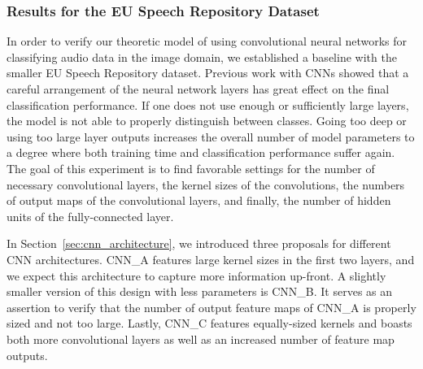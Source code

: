 \subsubsection{Results for the EU Speech Repository Dataset}
\label{sec:results_eu}
In order to verify our theoretic model of using convolutional neural networks for classifying audio data in the image domain, we established a baseline with the smaller EU Speech Repository dataset. Previous work with CNNs showed that a careful arrangement of the neural network layers has great effect on the final classification performance. If one does not use enough or sufficiently large layers, the model is not able to properly distinguish between classes. Going too deep or using too large layer outputs increases the overall number of model parameters to a degree where both training time and classification performance suffer again. The goal of this experiment is to find favorable settings for the number of necessary convolutional layers, the kernel sizes of the convolutions, the numbers of output maps of the convolutional layers, and finally, the number of hidden units of the fully-connected layer.

	In Section~\ref{sec:cnn_architecture}, we introduced three proposals for different CNN architectures. CNN\_A features large kernel sizes in the first two layers, and we expect this architecture to capture more information up-front. A slightly smaller version of this design with less parameters is CNN\_B. It serves as an assertion to verify that the number of output feature maps of CNN\_A is properly sized and not too large. Lastly, CNN\_C features equally-sized kernels and boasts both more convolutional layers as well as an increased number of feature map outputs.

